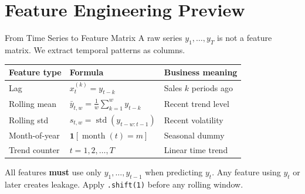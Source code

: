 \documentclass[aspectratio=169, 11pt]{beamer}
\begin{document}
\section{Feature Engineering Preview}


\begin{frame}{From Time Series to Feature Matrix}
  A raw series $y_1, \ldots, y_T$ is not a feature matrix.
  We extract temporal patterns as columns.\\[2pt]
  {\small {}}
  \begin{center}
    {\footnotesize
    \begin{tabular}{llp{3.8cm}}
      \toprule
      \textbf{Feature type} & \textbf{Formula} & \textbf{Business meaning} \\
      \midrule
      Lag            & $x_t^{(k)} = y_{t-k}$
                     & Sales $k$ periods ago \\
      Rolling mean   & $\bar{y}_{t,w} = \tfrac{1}{w}\sum_{k=1}^{w} y_{t-k}$
                     & Recent trend level \\
      Rolling std    & $s_{t,w} = \operatorname{std}(y_{t-w:t-1})$
                     & Recent volatility \\
      Month-of-year  & $\mathbf{1}[\operatorname{month}(t) = m]$
                     & Seasonal dummy \\
      Trend counter  & $t = 1, 2, \ldots, T$
                     & Linear time trend \\
      \bottomrule
    \end{tabular}
    }
  \end{center}
  \begin{warningbox}
    {\small All features \textbf{must} use only
    $y_1, \ldots, y_{t-1}$ when predicting $y_t$.
    Any feature using $y_t$ or later creates leakage.
    Apply \texttt{.shift(1)} before any rolling window.}
  \end{warningbox}
\end{frame}
\end{document}
